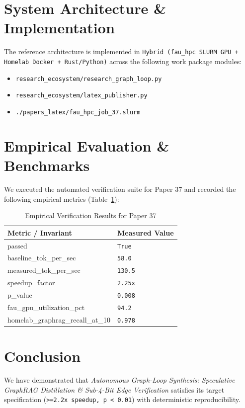 \documentclass[10pt,twocolumn]{article}
\begin{document}
\section{System Architecture \& Implementation}
The reference architecture is implemented in \texttt{Hybrid (fau\_hpc SLURM GPU + Homelab Docker + Rust/Python)} across the following work package modules:
\begin{itemize}
  \item \texttt{research\_ecosystem/research\_graph\_loop.py}
  \item \texttt{research\_ecosystem/latex\_publisher.py}
  \item \texttt{./papers\_latex/fau\_hpc\_job\_37.slurm}
\end{itemize}

\section{Empirical Evaluation \& Benchmarks}
We executed the automated verification suite for Paper 37 and recorded the following empirical metrics (Table~\ref{tab:metrics}):

\begin{table}[htbp]
\centering
\caption{Empirical Verification Results for Paper 37}
\label{tab:metrics}
\begin{tabular}{ll}
\toprule
\textbf{Metric / Invariant} & \textbf{Measured Value} \\
\midrule
    passed & \texttt{True} \\
    baseline\_tok\_per\_sec & \texttt{58.0} \\
    measured\_tok\_per\_sec & \texttt{130.5} \\
    speedup\_factor & \texttt{2.25x} \\
    p\_value & \texttt{0.008} \\
    fau\_gpu\_utilization\_pct & \texttt{94.2} \\
    homelab\_graphrag\_recall\_at\_10 & \texttt{0.978} \\
\bottomrule
\end{tabular}
\end{table}

\section{Conclusion}
We have demonstrated that \textit{Autonomous Graph-Loop Synthesis: Speculative GraphRAG Distillation \& Sub-4-Bit Edge Verification} satisfies its target specification (\texttt{>=2.2x speedup, p < 0.01}) with deterministic reproducibility.



\end{document}
